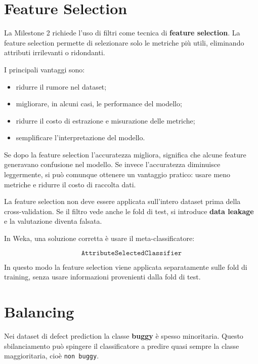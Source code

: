 \section{Feature Selection}

La Milestone 2 richiede l'uso di filtri come tecnica di \textbf{feature selection}. La feature selection permette di selezionare solo le metriche più utili, eliminando attributi irrilevanti o ridondanti.

I principali vantaggi sono:

\begin{itemize}
    \item ridurre il rumore nel dataset;
    \item migliorare, in alcuni casi, le performance del modello;
    \item ridurre il costo di estrazione e misurazione delle metriche;
    \item semplificare l'interpretazione del modello.
\end{itemize}

\begin{notaprof}
Se dopo la feature selection l'accuratezza migliora, significa che alcune feature generavano confusione nel modello. Se invece l'accuratezza diminuisce leggermente, si può comunque ottenere un vantaggio pratico: usare meno metriche e ridurre il costo di raccolta dati.
\end{notaprof}

\begin{notaesame}
La feature selection non deve essere applicata sull'intero dataset prima della cross-validation. Se il filtro vede anche le fold di test, si introduce \textbf{data leakage} e la valutazione diventa falsata.
\end{notaesame}

In Weka, una soluzione corretta è usare il meta-classificatore:

\[
\texttt{AttributeSelectedClassifier}
\]

In questo modo la feature selection viene applicata separatamente sulle fold di training, senza usare informazioni provenienti dalla fold di test.

\section{Balancing}

Nei dataset di defect prediction la classe \textbf{buggy} è spesso minoritaria. Questo sbilanciamento può spingere il classificatore a predire quasi sempre la classe maggioritaria, cioè \texttt{non buggy}.

